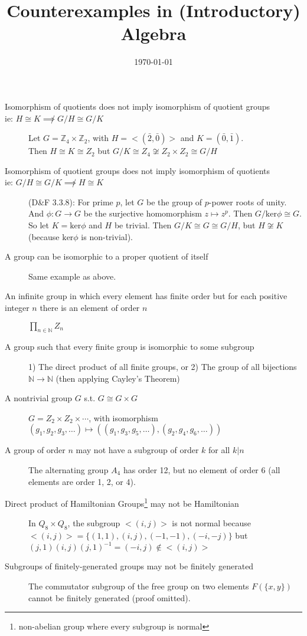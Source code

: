 \documentclass[]{article}
\title{Counterexamples in (Introductory) Algebra}
\author{}
\date{\today}
\newcommand{\x}{\times}
\newcommand{\Z}{\mathbb{Z}}
\begin{document}
\maketitle

\begin{description}
\item[Isomorphism of quotients does not imply isomorphism of quotient groups \\
ie: $H \cong K \not\implies G/H \cong G/K$]
Let $G =\Z_4 \x \Z_2$, with $H = <(\bar 2, \bar 0)>$ and $K = (\bar 0, \bar 1)$. \\
Then $H \cong K \cong Z_2$ but $G / K \cong Z_4 \not\cong Z_2 \x Z_2 \cong G / H$

\item[Isomorphism of quotient groups does not imply isomorphism of quotients \\
ie: $G/H \cong G/K \not\implies H \cong K$]
(D\&F 3.3.8): For prime $p$, let $G$ be the group of $p$-power roots of unity.
And $\phi: G \to G$ be the surjective homomorphism $z \mapsto z^p$. Then $G /
\text{ker} \phi \cong G$. \\
So let $K = \text{ker}\phi$ and $H$ be trivial. Then $G/K \cong G \cong G/H$,
but $H \not\cong K$ (because $\text{ker} \phi$ is non-trivial).

\item[A group can be isomorphic to a proper quotient of itself]
Same example as above.

\item[An infinite group in which every element has finite order but for each positive
integer $n$ there is an element of order $n$]
$\prod_{n \in \mathbb{N}} Z_n$

\item[A group such that every finite group is isomorphic to some subgroup]
1) The direct product of all finite groups, or 2) The group of all bijections
$\mathbb{N} \to \mathbb{N}$ (then applying Cayley's Theorem)

\item[A nontrivial group $G$ s.t. $G \cong G \x G$]
$G = Z_2 \x Z_2 \x \cdots$, with isomorphism $(g_1, g_2, g_3, \hdots) \mapsto
((g_1, g_3, g_5, \hdots), (g_2, g_4, g_6, \hdots))$

\item[A group of order $n$ may not have a subgroup of order $k$ for all $k | n$]
The alternating group $A_4$ has order 12, but no element of order 6 (all elements are order 1, 2, or 4).

\item[Direct product of Hamiltonian Groups\footnote{non-abelian group where
every subgroup is normal} may not be Hamiltonian]
In $Q_8 \x Q_8$, the subgroup $<(i, j)>$ is not normal because $<(i, j)> = \{(1,
1), (i, j), (-1, -1), (-i, -j) \}$ but $(j, 1)(i, j)(j, 1)^{-1} = (-i, j)
\not\in <(i, j)>$

\item[Subgroups of finitely-generated groups may not be finitely generated]
The commutator subgroup of the free group on two elements $F(\{x, y\})$ cannot
be finitely generated (proof omitted).

\end{description}
\end{document}
